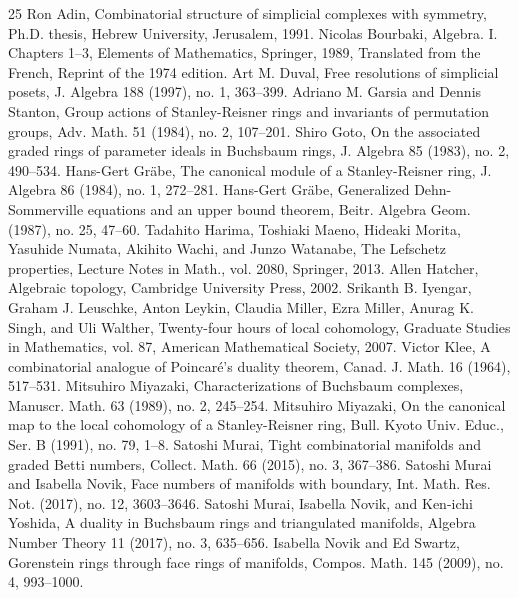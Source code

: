\begin{thebibliography}{25}
 Ron Adin, Combinatorial structure of simplicial complexes with symmetry, Ph.D. thesis, Hebrew University, Jerusalem, 1991.
 Nicolas Bourbaki, Algebra. I. Chapters 1–3, Elements of Mathematics, Springer, 1989, Translated from the French, Reprint of the 1974 edition.
 Art M. Duval, Free resolutions of simplicial posets, J. Algebra 188 (1997), no. 1, 363–399.
 Adriano M. Garsia and Dennis Stanton, Group actions of Stanley-Reisner rings and invariants of permutation groups, Adv. Math. 51 (1984), no. 2, 107–201.
 Shiro Goto, On the associated graded rings of parameter ideals in Buchsbaum rings, J. Algebra 85 (1983), no. 2, 490–534.
 Hans-Gert Gräbe, The canonical module of a Stanley-Reisner ring, J. Algebra 86 (1984), no. 1, 272–281.
 Hans-Gert Gräbe, Generalized Dehn-Sommerville equations and an upper bound theorem, Beitr. Algebra Geom. (1987), no. 25, 47–60.
 Tadahito Harima, Toshiaki Maeno, Hideaki Morita, Yasuhide Numata, Akihito Wachi, and Junzo Watanabe, The Lefschetz properties, Lecture Notes in Math., vol. 2080, Springer, 2013.
 Allen Hatcher, Algebraic topology, Cambridge University Press, 2002.
 Srikanth B. Iyengar, Graham J. Leuschke, Anton Leykin, Claudia Miller, Ezra Miller, Anurag K. Singh, and Uli Walther, Twenty-four hours of local cohomology, Graduate Studies in Mathematics, vol. 87, American Mathematical Society, 2007.
 Victor Klee, A combinatorial analogue of Poincaré’s duality theorem, Canad. J. Math. 16 (1964), 517–531.
 Mitsuhiro Miyazaki, Characterizations of Buchsbaum complexes, Manuscr. Math. 63 (1989), no. 2, 245–254.
 Mitsuhiro Miyazaki, On the canonical map to the local cohomology of a Stanley-Reisner ring, Bull. Kyoto Univ. Educ., Ser. B (1991), no. 79, 1–8.
 Satoshi Murai, Tight combinatorial manifolds and graded Betti numbers, Collect. Math. 66 (2015), no. 3, 367–386.
 Satoshi Murai and Isabella Novik, Face numbers of manifolds with boundary, Int. Math. Res. Not. (2017), no. 12, 3603–3646.
 Satoshi Murai, Isabella Novik, and Ken-ichi Yoshida, A duality in Buchsbaum rings and triangulated manifolds, Algebra Number Theory 11 (2017), no. 3, 635–656.
 Isabella Novik and Ed Swartz, Gorenstein rings through face rings of manifolds, Compos. Math. 145 (2009), no. 4, 993–1000.

\end{thebibliography}
